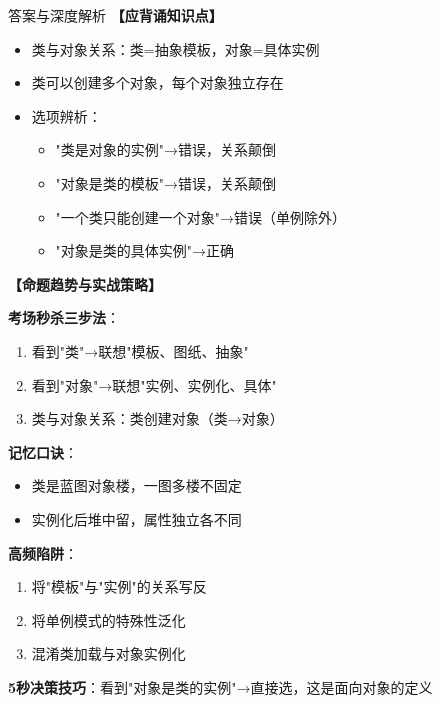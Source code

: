 \documentclass[12pt, a4paper]{ctexart}
\begin{document}
\begin{enumerate}[label=\textbf{\arabic*.}]
\begin{bluebox}{答案与深度解析}
		      \textbf{【应背诵知识点】}
		      \begin{itemize}[label={}, nosep]
			      \item 类与对象关系：类=抽象模板，对象=具体实例
			      \item 类可以创建多个对象，每个对象独立存在
			      \item 选项辨析：
			            \begin{itemize}[label={}, nosep]
				            \item "类是对象的实例"→错误，关系颠倒
				            \item "对象是类的模板"→错误，关系颠倒
				            \item "一个类只能创建一个对象"→错误（单例除外）
				            \item "对象是类的具体实例"→正确
			            \end{itemize}
		      \end{itemize}

		      \textbf{【命题趋势与实战策略】}

		      \textbf{考场秒杀三步法}：
		      \begin{enumerate}[label={}, nosep]
			      \item 看到"类"→联想"模板、图纸、抽象"
			      \item 看到"对象"→联想"实例、实例化、具体"
			      \item 类与对象关系：类创建对象（类→对象）
		      \end{enumerate}

		      \textbf{记忆口诀}：
		      \begin{itemize}[label={}, nosep]
			      \item 类是蓝图对象楼，一图多楼不固定
			      \item 实例化后堆中留，属性独立各不同
		      \end{itemize}

		      \textbf{高频陷阱}：
		      \begin{enumerate}[label={}, nosep]
			      \item 将"模板"与"实例"的关系写反
			      \item 将单例模式的特殊性泛化
			      \item 混淆类加载与对象实例化
		      \end{enumerate}

		      \textbf{5秒决策技巧}：看到"对象是类的实例"→直接选，这是面向对象的定义
	      \end{bluebox}

	      \vspace{1em}


\end{enumerate}
\end{document}
